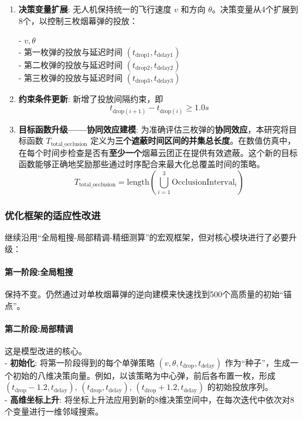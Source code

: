 \documentclass[12pt]{article}
\begin{document}
\begin{CJK}{UTF8}{gbsn}
		\begin{enumerate}
			\item \textbf{决策变量扩展}: 无人机保持统一的飞行速度 $v$ 和方向 $\theta$。决策变量从4个扩展到8个，以控制三枚烟幕弹的投放：
			
			- $v, \theta$\\
			\indent - 第一枚弹的投放与延迟时间 $(t_{\text{drop1}}, t_{\text{delay1}})$\\
			\indent - 第二枚弹的投放与延迟时间 $(t_{\text{drop2}}, t_{\text{delay2}})$\\
			\indent - 第三枚弹的投放与延迟时间 $(t_{\text{drop3}}, t_{\text{delay3}})$
			
			\item \textbf{约束条件更新}: 新增了投放间隔约束，即
			\begin{equation}
				t_{\text{drop}(i+1)} - t_{\text{drop}(i)} \ge 1.0 s
			\end{equation}
			
			\item \textbf{目标函数升级——协同效应建模}:
			为准确评估三枚弹的\textbf{协同效应}，本研究将目标函数 $T_{\text{total\_occlusion}}$ 定义为\textbf{三个遮蔽时间区间的并集总长度}。在数值仿真中，在每个时间步检查是否有\textbf{至少一个}烟幕云团正在提供有效遮蔽。这个新的目标函数能够正确地奖励那些通过时序配合来最大化总覆盖时间的策略。
			\begin{equation}
				T_{\text{total\_occlusion}} = \text{length} \left( \bigcup_{i=1}^{3} \text{OcclusionInterval}_i \right)
			\end{equation}
			
		\end{enumerate}
		
		\subsubsection{优化框架的适应性改进}
		继续沿用“全局粗搜-局部精调-精细测算”的宏观框架，但对核心模块进行了必要升级：
		
		\paragraph{第一阶段:全局粗搜} 保持不变。仍然通过对单枚烟幕弹的逆向建模来快速找到500个高质量的初始“锚点”。
		
		\paragraph{第二阶段:局部精调} 这是模型改进的核心。\\
		\indent - \textbf{初始化}: 将第一阶段得到的每个单弹策略 $(v, \theta, t_{\text{drop}}, t_{\text{delay}})$ 作为“种子”，生成一个初始的八维决策向量。例如，以该策略为中心弹，前后各布置一枚，形成 $(t_{\text{drop}}-1.2, t_{\text{delay}})$, $(t_{\text{drop}}, t_{\text{delay}})$, $(t_{\text{drop}}+1.2, t_{\text{delay}})$ 的初始投放序列。\\
		\indent - \textbf{高维坐标上升}: 将坐标上升法应用到新的8维决策空间中，在每次迭代中依次对8个变量进行一维邻域搜索。
		

\end{CJK}
\end{document}
